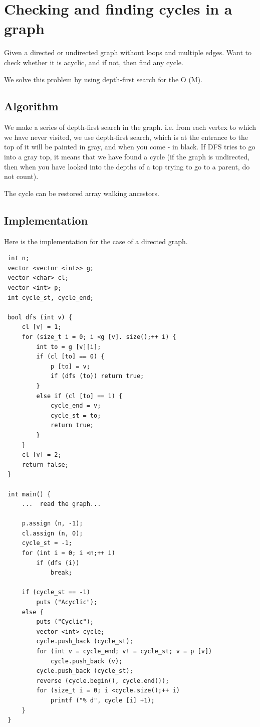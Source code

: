 \section{ Checking and finding cycles in a graph }
Given a directed or undirected graph without loops and multiple edges. Want to check whether it is acyclic, and if not, then find any cycle.

We solve this problem by using depth-first search for the O (M).

\subsection{ Algorithm }
We make a series of depth-first search in the graph. i.e. from each vertex to which we have never visited, we use depth-first search, which is at the entrance to the top of it will be painted in gray, and when you come - in black. If DFS tries to go into a gray top, it means that we have found a cycle (if the graph is undirected, then when you have looked into the depths of a top trying to go to a parent, do not count).

The cycle can be restored array walking ancestors.

\subsection{ Implementation }
Here is the implementation for the case of a directed graph.

\begin{verbatim}
 int n;
 vector <vector <int>> g;
 vector <char> cl;
 vector <int> p;
 int cycle_st, cycle_end;

 bool dfs (int v) {
     cl [v] = 1;
     for (size_t i = 0; i <g [v]. size();++ i) {
         int to = g [v][i];
         if (cl [to] == 0) {
             p [to] = v;
             if (dfs (to)) return true;
         }
         else if (cl [to] == 1) {
             cycle_end = v;
             cycle_st = to;
             return true;
         }
     }
     cl [v] = 2;
     return false;
 }

 int main() {
     ...  read the graph...

     p.assign (n, -1);
     cl.assign (n, 0);
     cycle_st = -1;
     for (int i = 0; i <n;++ i)
         if (dfs (i))
             break;

     if (cycle_st == -1)
         puts ("Acyclic");
     else {
         puts ("Cyclic");
         vector <int> cycle;
         cycle.push_back (cycle_st);
         for (int v = cycle_end; v! = cycle_st; v = p [v])
             cycle.push_back (v);
         cycle.push_back (cycle_st);
         reverse (cycle.begin(), cycle.end());
         for (size_t i = 0; i <cycle.size();++ i)
             printf ("% d", cycle [i] +1);
     }
 } 
\end{verbatim}
